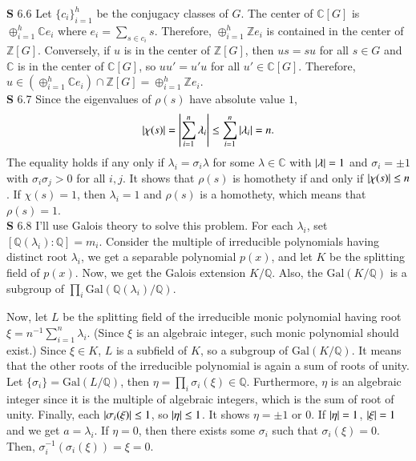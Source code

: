 \documentclass[a4paper, 12pt]{article}
\theoremstyle{Mydefinition}
\theoremstyle{Mytheorem}
\begin{document}
\noindent \textbf{S} 6.6
Let $\{c_i\}_{i=1}^h$ be the conjugacy classes of $G$. The center of $\mathbb{C}[G]$ is $\oplus_{i=1}^h \mathbb{C}e_i$ where $e_i = \sum_{s\in c_i}s$. Therefore, $\oplus_{i=1}^h \mathbb{Z}e_i$ is contained in the center of $\mathbb{Z}[G]$. Conversely, if $u$ is in the center of $\mathbb{Z}[G]$, then $us = su$ for all $s\in G$ and $\mathbb{C}$ is in the center of $\mathbb{C}[G]$, so $uu' = u'u$ for all $u'\in \mathbb{C}[G]$. Therefore, $u\in \left(\oplus_{i=1}^h \mathbb{C}e_i\right)\cap \mathbb{Z}[G] = \oplus_{i=1}^h \mathbb{Z}e_i$.\\

\noindent \textbf{S} 6.7
Since the eigenvalues of $\rho(s)$ have absolute value $1$,
\begin{equation}
    \abs{\chi(s)} = \abs{\sum_{i=1}^n \lambda_i}\leq \sum_{i=1}^n\abs{\lambda_i} = n.
\end{equation}
The equality holds if any only if $\lambda_i = \sigma_i \lambda$ for some $\lambda\in \mathbb{C}$ with $\abs{\lambda} = 1$ and $\sigma_i = \pm 1$ with $\sigma_i\sigma_j>0$ for all $i,j$. It shows that $\rho(s)$ is homothety if and only if $\abs{\chi(s)}\leq n$. If $\chi(s) = 1$, then $\lambda_i=1$ and $\rho(s)$ is a homothety, which means that $\rho(s) = 1$.\\

\noindent \textbf{S} 6.8
I'll use Galois theory to solve this problem. For each $\lambda_i$, set $[\mathbb{Q}(\lambda_i):\mathbb{Q}] = m_i$. Consider the multiple of irreducible polynomials having distinct root $\lambda_i$, we get a separable polynomial $p(x)$, and let $K$ be the splitting field of $p(x)$. Now, we get the Galois extension $K/\mathbb{Q}$. Also, the $\mathrm{Gal}(K/\mathbb{Q})$ is a subgroup of $\prod_{i}\mathrm{Gal}(\mathbb{Q}(\lambda_i)/\mathbb{Q})$.

Now, let $L$ be the splitting field of the irreducible monic polynomial having root $\xi=n^{-1}\sum_{i=1}^n \lambda_i$. (Since $\xi$ is an algebraic integer, such monic polynomial should exist.) Since $\xi\in K$, $L$ is a subfield of $K$, so a subgroup of $\mathrm{Gal}(K/\mathbb{Q})$. It means that the other roots of the irreducible polynomial is again a sum of roots of unity. Let $\{\sigma_i\} = \mathrm{Gal}(L/\mathbb{Q})$, then $\eta = \prod_{i} \sigma_i(\xi)\in\mathbb{Q}$. Furthermore, $\eta$ is an algebraic integer since it is the multiple of algebraic integers, which is the sum of root of unity. Finally, each $\abs{\sigma_i(\xi)}\leq 1$, so $\abs{\eta}\leq 1$. It shows $\eta = \pm 1$ or $0$. If $\abs{\eta} = 1$, $\abs{\xi} = 1$ and we get $a = \lambda_i$. If $\eta = 0$, then there exists some $\sigma_i$ such that $\sigma_i(\xi)= 0$. Then, $\sigma_{i}^{-1}\left(\sigma_i(\xi)\right) = \xi = 0$.\\
\end{document}
